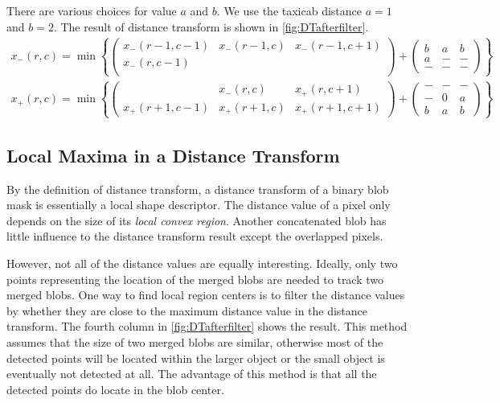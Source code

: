 There are various choices for value $a$ and $b$. We use the taxicab distance $a=1$ and $b=2$. The result of distance transform is shown in \autoref{fig:DTafterfilter}.
\begin{align}\label{eq:chamferDT}
  x_-(r,c) = \min\left\{\left(\begin{array}{ccc}
                          x_-(r-1,c-1) & x_-(r-1,c) & x_-(r-1,c+1) \\
                          x_-(r,c-1)\\
                        \end{array}  \right)+
                        \begin{pmatrix}
                          b & a & b \\
                          a & - & - \\
                          - & - & -
                        \end{pmatrix} \right\}
\\
  x_+(r,c) = \min\left\{
            \left(\begin{array}{ccc}
                         &x_-(r,c)&x_+(r,c+1)\\
            x_+(r+1,c-1)& x_+(r+1,c) &x_+(r+1,c+1)
                        \end{array}
                        \right)+
                        \begin{pmatrix}
                          - & - & - \\
                          - & 0 & a \\
                          b & a & b
                        \end{pmatrix}
                        \right\}
\end{align}
\subsection{Local Maxima in a Distance Transform}
By the definition of distance transform, a distance transform of a binary blob mask is essentially a local shape descriptor. The distance value of a pixel only depends on the size of its \emph{local convex region}. Another concatenated blob has little influence to the distance transform result except the overlapped pixels.

However, not all of the distance values are equally interesting. Ideally, only two points representing the location of the merged blobs are needed to track two merged blobs. One way to find local region centers is to filter the distance values by whether they are close to the maximum distance value in the distance transform. The fourth column in \autoref{fig:DTafterfilter} shows the result. This method assumes that the size of two merged blobs are similar, otherwise most of the detected points will be located within the larger object or the small object is eventually not detected at all. The advantage of this method is that all the detected points do locate in the blob center.

